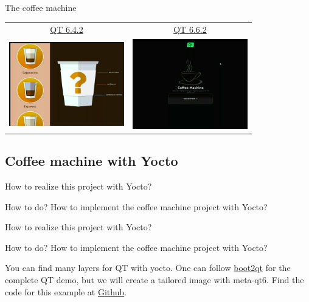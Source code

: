 \documentclass{beamer}
\begin{document}
\begin{frame}{The coffee machine}
	\begin{tabular}{cc}
		\href{https://github.com/qt/qtdoc/tree/v6.4.2/examples/demos/coffee}{QT 6.4.2} &
		\href{https://github.com/qt/qtdoc/tree/v6.6.2/examples/demos/coffee}{QT 6.6.2} \\
		\includegraphics[width=5cm]{assets/Screenshot_Coffee_QT6.4.2.png} &
		\includegraphics[width=5cm]{assets/Screenshot_Coffee_QT6.6.2.png} \\
	\end{tabular}
\end{frame}

\subsection{Coffee machine with Yocto}

\begin{frame}{How to realize this project with Yocto?}
	\begin{block}{How to do?}
		How to implement the coffee machine project with Yocto?
	\end{block}
\end{frame}


\begin{frame}{How to realize this project with Yocto?}
	\begin{block}{How to do?}
		How to implement the coffee machine project with Yocto?
	\end{block}
	You can find many layers for QT with yocto. One can follow
	\href{https://code.qt.io/cgit/yocto/meta-boot2qt.git/tree/README.md}{boot2qt} for the complete QT demo,
	but we will create a tailored image with meta-qt6. Find the code for this example at
	\href{https://github.com/tomirgang/eh21_maintainable_linux/tree/main/examples/yocto_advance/qt}{Github}.
\end{frame}
\end{document}
